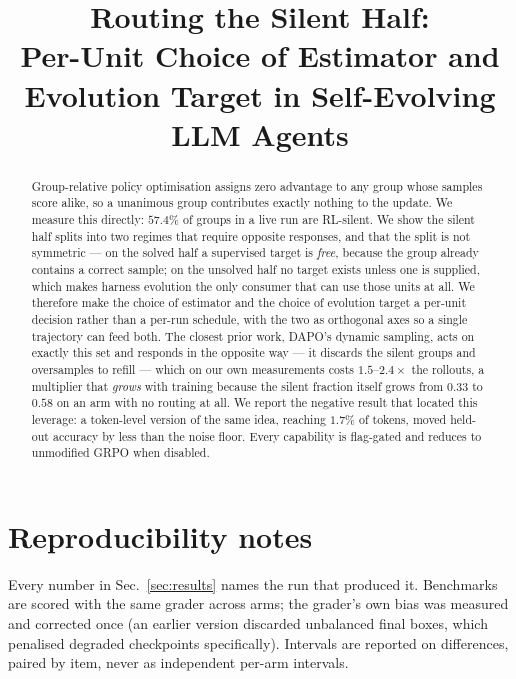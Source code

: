 \documentclass[11pt]{article}
\title{Routing the Silent Half:\\
       Per-Unit Choice of Estimator and Evolution Target in Self-Evolving LLM Agents}
\author{}
\date{}
\begin{document}
\maketitle

\begin{abstract}
Group-relative policy optimisation assigns zero advantage to any group whose samples score
alike, so a unanimous group contributes exactly nothing to the update. We measure this
directly: $57.4\%$ of groups in a live run are RL-silent. We show the silent half splits
into two regimes that require opposite responses, and that the split is not symmetric ---
on the solved half a supervised target is \emph{free}, because the group already contains a
correct sample; on the unsolved half no target exists unless one is supplied, which makes
harness evolution the only consumer that can use those units at all. We therefore make the
choice of estimator and the choice of evolution target a per-unit decision rather than a
per-run schedule, with the two as orthogonal axes so a single trajectory can feed both.
The closest prior work, DAPO's dynamic sampling, acts on exactly this set and responds in the
opposite way --- it discards the silent groups and oversamples to refill --- which on our own
measurements costs $1.5$--$2.4\times$ the rollouts, a multiplier that \emph{grows} with
training because the silent fraction itself grows from $0.33$ to $0.58$ on an arm with no
routing at all. We report the negative result that located this leverage: a token-level
version of the same idea, reaching $1.7\%$ of tokens, moved held-out accuracy by less than
the noise floor. Every capability is flag-gated and reduces to unmodified GRPO when disabled.
\end{abstract}





\section*{Reproducibility notes}
Every number in Sec.~\ref{sec:results} names the run that produced it. Benchmarks are scored
with the same grader across arms; the grader's own bias was measured and corrected once (an
earlier version discarded unbalanced final boxes, which penalised degraded checkpoints
specifically). Intervals are reported on differences, paired by item, never as independent
per-arm intervals.
\end{document}
